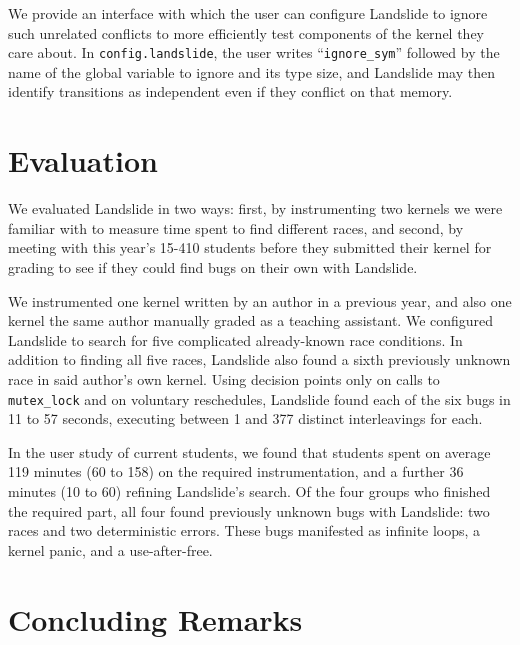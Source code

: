 \documentclass{llncs}
\begin{document}
We provide an interface with which the user can configure Landslide to ignore such unrelated conflicts to more efficiently test components of the kernel they care about. In \texttt{config.landslide}, the user writes ``\texttt{ignore\_sym}'' followed by the name of the global variable to ignore and its type size, and Landslide may then identify transitions as independent even if they conflict on that memory.

\squish
\section{Evaluation}
\squish

We evaluated Landslide in two ways: first, by instrumenting two kernels we were familiar with to measure time spent to find different races, and second, by meeting with this year's 15-410 students before they submitted their kernel for grading to see if they could find bugs on their own with Landslide.

We instrumented one kernel written by an author in a previous year, and also one kernel the same author manually graded as a teaching assistant. We configured Landslide to search for five complicated already-known race conditions. In addition to finding all five races, Landslide also found a sixth previously unknown race in said author's own kernel. Using decision points only on calls to \texttt{mutex\_lock} and on voluntary reschedules, Landslide found each of the six bugs in 11 to 57 seconds, executing between 1 and 377 distinct interleavings for each.

In the user study of current students, we found that students spent on average 119 minutes (60 to 158) on the required instrumentation, and a further 36 minutes (10 to 60) refining Landslide's search. Of the four groups who finished the required part, all four found previously unknown bugs with Landslide: two races and two deterministic errors. These bugs manifested as infinite loops, a kernel panic, and a use-after-free.

\squish
\section{Concluding Remarks}
\squish
\end{document}
